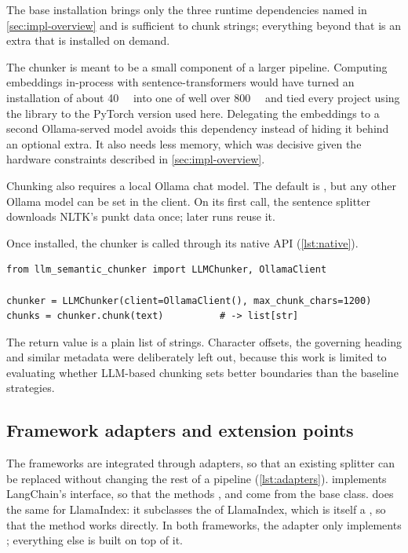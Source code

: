 The base installation brings only the three runtime dependencies named in
\cref{sec:impl-overview} and is sufficient to chunk strings; everything beyond that is an
extra that is installed on demand.

The chunker is meant to be a small component of a larger pipeline. Computing embeddings
in-process with sentence-transformers would have turned an installation of about
\SI{40}{\mega\byte} into one of well over \SI{800}{\mega\byte} and tied every project using
the library to the PyTorch version used here. Delegating the embeddings to a second
Ollama-served model avoids this dependency instead of hiding it behind an optional extra.
It also needs less memory, which was decisive given the hardware constraints described in
\cref{sec:impl-overview}.

Chunking also requires a local Ollama chat model. The default is , but any
other Ollama model can be set in the client. On its first call, the sentence splitter
downloads NLTK's punkt data once; later runs reuse it.

Once installed, the chunker is called through its native API (\cref{lst:native}).

\begin{lstlisting}[caption={Chunking a string with the native API.},label={lst:native}]
from llm_semantic_chunker import LLMChunker, OllamaClient

chunker = LLMChunker(client=OllamaClient(), max_chunk_chars=1200)
chunks = chunker.chunk(text)          # -> list[str]
\end{lstlisting}

The return value is a plain list of strings. Character offsets, the governing heading and
similar metadata were deliberately left out, because this work is limited to evaluating
whether LLM-based chunking sets better boundaries than the baseline strategies.

\subsection{Framework adapters and extension points}
\label{sec:integrations}
\label{sec:extending}

The frameworks are integrated through adapters, so that an existing splitter can be
replaced without changing the rest of a pipeline (\cref{lst:adapters}).
 implements LangChain's  interface, so that
the methods ,  and
 come from the base class.  does the same for LlamaIndex: it
subclasses the  of LlamaIndex, which is itself a , so
that the method  works directly. In both frameworks,
the adapter only implements ; everything else is built on top of it.

